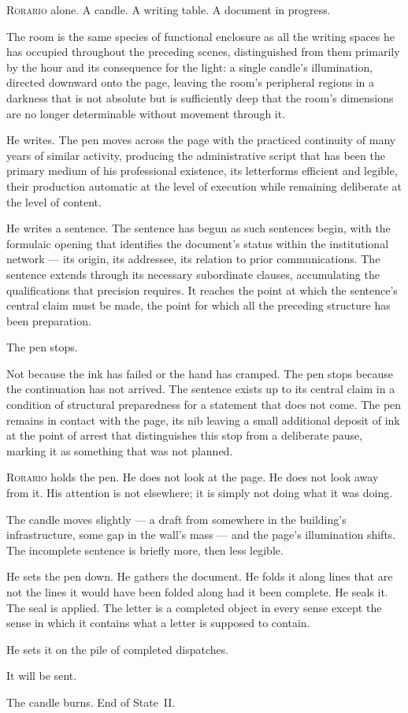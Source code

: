 \documentclass[12pt, oneside]{article}
\newenvironment{action}{%
  \vspace{0.6em}%
  \noindent\ignorespaces%
}{%
  \par\vspace{0.6em}%
}
\begin{document}
\begin{action}
\textsc{Rorario} alone. A candle. A writing table. A document in progress.

The room is the same species of functional enclosure as all the writing spaces he has occupied throughout the preceding scenes, distinguished from them primarily by the hour and its consequence for the light: a single candle's illumination, directed downward onto the page, leaving the room's peripheral regions in a darkness that is not absolute but is sufficiently deep that the room's dimensions are no longer determinable without movement through it.

He writes. The pen moves across the page with the practiced continuity of many years of similar activity, producing the administrative script that has been the primary medium of his professional existence, its letterforms efficient and legible, their production automatic at the level of execution while remaining deliberate at the level of content.

He writes a sentence. The sentence has begun as such sentences begin, with the formulaic opening that identifies the document's status within the institutional network --- its origin, its addressee, its relation to prior communications. The sentence extends through its necessary subordinate clauses, accumulating the qualifications that precision requires. It reaches the point at which the sentence's central claim must be made, the point for which all the preceding structure has been preparation.

The pen stops.

Not because the ink has failed or the hand has cramped. The pen stops because the continuation has not arrived. The sentence exists up to its central claim in a condition of structural preparedness for a statement that does not come. The pen remains in contact with the page, its nib leaving a small additional deposit of ink at the point of arrest that distinguishes this stop from a deliberate pause, marking it as something that was not planned.

\textsc{Rorario} holds the pen. He does not look at the page. He does not look away from it. His attention is not elsewhere; it is simply not doing what it was doing.

The candle moves slightly --- a draft from somewhere in the building's infrastructure, some gap in the wall's mass --- and the page's illumination shifts. The incomplete sentence is briefly more, then less legible.

He sets the pen down. He gathers the document. He folds it along lines that are not the lines it would have been folded along had it been complete. He seals it. The seal is applied. The letter is a completed object in every sense except the sense in which it contains what a letter is supposed to contain.

He sets it on the pile of completed dispatches.

It will be sent.

The candle burns. End of State~II.
\end{action}
\end{document}
